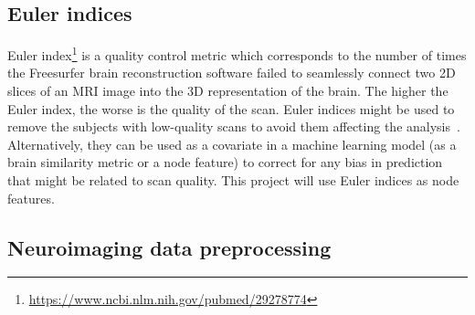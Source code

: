





\subsection{Euler indices}
Euler index\footnote{\url{https://www.ncbi.nlm.nih.gov/pubmed/29278774}} is a quality control metric which corresponds to the number of times the Freesurfer brain reconstruction software failed to seamlessly connect two 2D slices of an MRI image into the 3D representation of the brain. The higher the Euler index, the worse is the quality of the scan. Euler indices might be used to remove the subjects with low-quality scans to avoid them affecting the analysis~\cite{kaufmann2019}. Alternatively, they can be used as a covariate in a machine learning model (as a brain similarity metric or a node feature) to correct for any bias in prediction that might be related to scan quality. This project will use Euler indices as node features.


\subsection{Neuroimaging data preprocessing}

